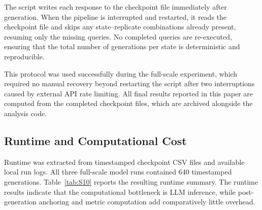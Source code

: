 \documentclass[11pt]{article}
\begin{document}
The script writes each response to the checkpoint file immediately after generation. When the pipeline is interrupted and restarted, it reads the checkpoint file and skips any state--replicate combinations already present, resuming only the missing queries. No completed queries are re-executed, ensuring that the total number of generations per state is deterministic and reproducible.

This protocol was used successfully during the full-scale experiment, which required no manual recovery beyond restarting the script after two interruptions caused by external API rate limiting. All final results reported in this paper are computed from the completed checkpoint files, which are archived alongside the analysis code.

\subsection{Runtime and Computational Cost}
\label{app:runtime}

Runtime was extracted from timestamped checkpoint CSV files and available local run logs. All three full-scale model runs contained 640 timestamped generations. Table~\ref{tab:S10} reports the resulting runtime summary. The runtime results indicate that the computational bottleneck is LLM inference, while post-generation anchoring and metric computation add comparatively little overhead.
\end{document}
